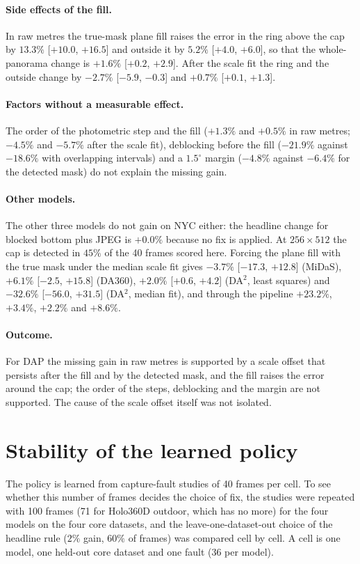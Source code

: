 \documentclass{article}
\begin{document}
\paragraph{Side effects of the fill.} In raw metres the true-mask plane fill raises the error in the ring above the cap by $13.3\%$ [$+10.0$, $+16.5$] and outside it by $5.2\%$ [$+4.0$, $+6.0$], so that the whole-panorama change is $+1.6\%$ [$+0.2$, $+2.9$]. After the scale fit the ring and the outside change by $-2.7\%$ [$-5.9$, $-0.3$] and $+0.7\%$ [$+0.1$, $+1.3$].

\paragraph{Factors without a measurable effect.} The order of the photometric step and the fill ($+1.3\%$ and $+0.5\%$ in raw metres; $-4.5\%$ and $-5.7\%$ after the scale fit), deblocking before the fill ($-21.9\%$ against $-18.6\%$ with overlapping intervals) and a $1.5^\circ$ margin ($-4.8\%$ against $-6.4\%$ for the detected mask) do not explain the missing gain.

\paragraph{Other models.} The other three models do not gain on NYC either: the headline change for blocked bottom plus JPEG is $+0.0\%$ because no fix is applied. At $256\times512$ the cap is detected in $45\%$ of the 40 frames scored here. Forcing the plane fill with the true mask under the median scale fit gives $-3.7\%$ [$-17.3$, $+12.8$] (MiDaS), $+6.1\%$ [$-2.5$, $+15.8$] (DA360), $+2.0\%$ [$+0.6$, $+4.2$] (DA$^2$, least squares) and $-32.6\%$ [$-56.0$, $+31.5$] (DA$^2$, median fit), and through the pipeline $+23.2\%$, $+3.4\%$, $+2.2\%$ and $+8.6\%$.

\paragraph{Outcome.} For DAP the missing gain in raw metres is supported by a scale offset that persists after the fill and by the detected mask, and the fill raises the error around the cap; the order of the steps, deblocking and the margin are not supported. The cause of the scale offset itself was not isolated.

\section{Stability of the learned policy}\label{app:stability}
The policy is learned from capture-fault studies of 40 frames per cell. To see whether this number of frames decides the choice of fix, the studies were repeated with 100 frames (71 for Holo360D outdoor, which has no more) for the four models on the four core datasets, and the leave-one-dataset-out choice of the headline rule ($2\%$ gain, $60\%$ of frames) was compared cell by cell. A cell is one model, one held-out core dataset and one fault (36 per model).
\end{document}
